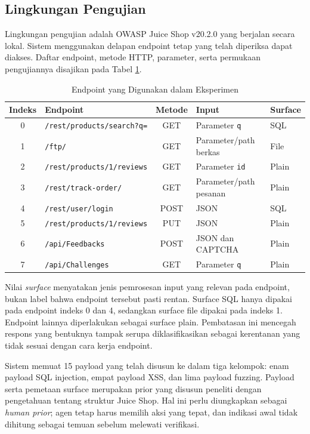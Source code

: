 \subsection{Lingkungan Pengujian}

Lingkungan pengujian adalah OWASP Juice Shop v20.2.0 yang berjalan secara lokal. Sistem menggunakan delapan endpoint tetap yang telah diperiksa dapat diakses. Daftar endpoint, metode HTTP, parameter, serta permukaan pengujiannya disajikan pada Tabel \ref{tab:endpoint_target}.

\begin{table}[H]
\centering
\caption{Endpoint yang Digunakan dalam Eksperimen}
\label{tab:endpoint_target}
\begin{tabular}{|c|p{5.2cm}|c|p{3.2cm}|p{2.3cm}|}
\hline
\textbf{Indeks} & \textbf{Endpoint} & \textbf{Metode} & \textbf{Input} & \textbf{Surface} \\ \hline
0 & \texttt{/rest/products/search?q=} & GET & Parameter \texttt{q} & SQL \\ \hline
1 & \texttt{/ftp/} & GET & Parameter/path berkas & File \\ \hline
2 & \texttt{/rest/products/1/reviews} & GET & Parameter \texttt{id} & Plain \\ \hline
3 & \texttt{/rest/track-order/} & GET & Parameter/path pesanan & Plain \\ \hline
4 & \texttt{/rest/user/login} & POST & JSON & SQL \\ \hline
5 & \texttt{/rest/products/1/reviews} & PUT & JSON & Plain \\ \hline
6 & \texttt{/api/Feedbacks} & POST & JSON dan CAPTCHA & Plain \\ \hline
7 & \texttt{/api/Challenges} & GET & Parameter \texttt{q} & Plain \\ \hline
\end{tabular}
\end{table}

Nilai \textit{surface} menyatakan jenis pemrosesan input yang relevan pada endpoint, bukan label bahwa endpoint tersebut pasti rentan. Surface SQL hanya dipakai pada endpoint indeks 0 dan 4, sedangkan surface file dipakai pada indeks 1. Endpoint lainnya diperlakukan sebagai surface plain. Pembatasan ini mencegah respons yang bentuknya tampak serupa diklasifikasikan sebagai kerentanan yang tidak sesuai dengan cara kerja endpoint.

Sistem memuat 15 payload yang telah disusun ke dalam tiga kelompok: enam payload SQL injection, empat payload XSS, dan lima payload fuzzing. Payload serta pemetaan surface merupakan prior yang disusun peneliti dengan pengetahuan tentang struktur Juice Shop. Hal ini perlu diungkapkan sebagai \textit{human prior}; agen tetap harus memilih aksi yang tepat, dan indikasi awal tidak dihitung sebagai temuan sebelum melewati verifikasi.

